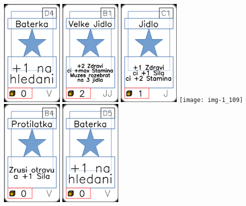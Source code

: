 \documentclass[a4paper]{article}
\begin{document}
	\includegraphics[width=3.0cm]{img-1_78}
	\includegraphics[width=3.0cm]{img-1_35}
	\includegraphics[width=3.0cm]{img-1_10}
	\texttt{[image: img-1\_109]}
	\includegraphics[width=3.0cm]{img-1_68}
	\includegraphics[width=3.0cm]{img-1_79}
\end{document}
